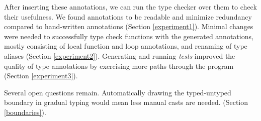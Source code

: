 After inserting these annotations, we can run the
type checker over them to check their usefulness.
We found annotations to be readable and minimize
redundancy compared to hand-written annotations
(Section \ref{experiment1}).
Minimal changes were needed to successfully type check
functions with the generated annotations,
mostly consisting of local function and loop annotations,
and renaming of type aliases
(Section \ref{experiment2}).
Generating and running \textit{tests} improved the quality
of type annotations by exercising more paths through the
program (Section \ref{experiment3}).

Several open questions remain.
Automatically
drawing the typed-untyped boundary in gradual typing
would mean less manual casts are needed.
(Section \ref{boundaries}).

%
%
%



